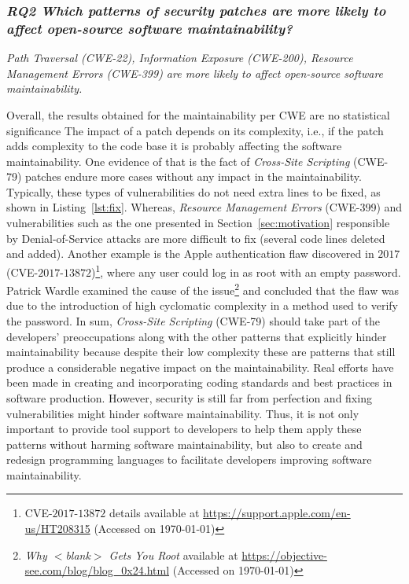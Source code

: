 \documentclass[10pt,conference]{IEEEtran}
\begin{document}
\subsubsection*{\textit{\textbf{RQ2} \textbf{Which patterns of security patches are more likely to
affect open-source software maintainability?}}}


\textit{Path Traversal (CWE-22), Information Exposure (CWE-200), Resource Management Errors (CWE-399) are more likely to affect
open-source software maintainability.}

Overall, the results obtained for the maintainability per CWE are no statistical significance 
The impact of a patch depends on its complexity, i.e., if the patch
adds complexity to the code base it is probably affecting the software
maintainability. One evidence of that is the fact of \emph{Cross-Site Scripting} (CWE-79)
patches endure more
cases without any impact in the maintainability. Typically, these types of
vulnerabilities do not need extra lines to be fixed, as shown in
Listing~\ref{lst:fix}. Whereas, \emph{Resource Management Errors} (CWE-399) and vulnerabilities
such as the one presented in Section~\ref{sec:motivation} responsible by Denial-of-Service
attacks are more difficult to fix (several code lines deleted and added).
Another example is the Apple authentication flaw discovered in $2017$
(CVE-$2017$-$13872$)\footnote{CVE-$2017$-$13872$ details available at
\url{https://support.apple.com/en-us/HT208315} (Accessed on \today{})}, where any user
could log in as root with an empty password. Patrick Wardle examined the cause
of the issue\footnote{\emph{Why $<$blank$>$ Gets You Root} available at
\url{https://objective-see.com/blog/blog\_0x24.html} (Accessed on \today{})} and
concluded that the flaw was due to the introduction of high cyclomatic complexity
in a method used to verify the password. In sum, \emph{Cross-Site Scripting} (CWE-79) should take part of the
developers' preoccupations along with the other patterns that explicitly hinder
maintainability because despite their low complexity these are patterns that
still produce a considerable negative impact on the maintainability. Real
efforts have been made in creating and incorporating coding standards and best
practices in software production. However, security is still far from perfection
and fixing vulnerabilities might hinder software maintainability. Thus, it is
not only important to provide tool support to developers to help them apply these
patterns without harming software maintainability, but also to create and redesign
programming languages to facilitate developers improving software maintainability.
\end{document}
